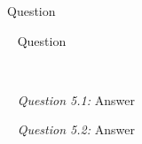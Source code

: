 \documentclass[12pt]{article}
\begin{document}
\date{}
\maketitle


\newline
Question

~\newline
{}
\newline
Question

~\newline


\pagebreak
{}

~\newline
\textit{Question 5.1:}
\newline
Answer

~\newline
\textit{Question 5.2:}
\newline
Answer

~\newline
\end{document}
